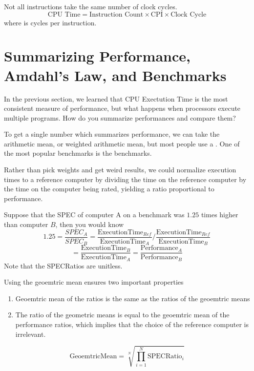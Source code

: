 \documentclass[12pt]{scrartcl}
\begin{document}
\begin{note}
  Not all instructions take the same number of clock cycles. 
  \[\text{CPU Time} = \text{Instruction Count} \times \text{CPI} \times \text{Clock Cycle}\]
  where  is cycles per instruction. 
\end{note}

\section{Summarizing Performance, Amdahl's Law, and Benchmarks}

\begin{remark}
  In the previous section, we learned that CPU Exectution Time is the most consistent measure of 
  performance, but what happens when processors execute multiple programs. How do you summarize
   performances and compare them?
\end{remark}

\begin{definition}
  To get a single number which summarizes performance, we can take the arithmetic mean, 
  or weighted arithmetic mean, but most people use a . One of the most popular benchmarks 
  is the  benchmarks. 

  Rather than pick weights and get weird results, we could normalize execution times 
  to a reference computer by dividing the time on the reference computer by the time on the computer being rated, yielding a ratio proportional to performance.
\end{definition}

\begin{example}
  Suppose that the SPEC of computer A on a benchmark was $1.25$ times higher than 
  computer $B$, then you would know 
  \[1.25 = \frac{SPEC_A}{SPEC_B} = \frac{\text{ExecutionTime}_{Ref}}{\text{ExecutionTime}_A} / \frac{\text{ExecutionTime}_{Ref}}{\text{ExecutionTime}_B}\]
  \[= \frac{\text{ExecutionTime}_B}{\text{ExecutionTime}_A} = \frac{\text{Performance}_{A}}{\text{Performance}_B}\]
  Note that the SPECRatios are unitless. 
\end{example}

\begin{definition}
  Using the geoemtric mean ensures two important properties 
  \begin{enumerate}
    \item Geoemtric mean of the ratios is the same as the ratios of the geoemtric means 
    \item The ratio of the geometric means is equal to the geoemtric mean of the performance ratios, 
    which implies that the choice of the reference computer is irrelevant.  
  \end{enumerate}
  \[\text{GeoemtricMean} = \sqrt[N]{\prod_{i=1}^N \text{SPECRatio}_i}\]
\end{definition}
\end{document}

